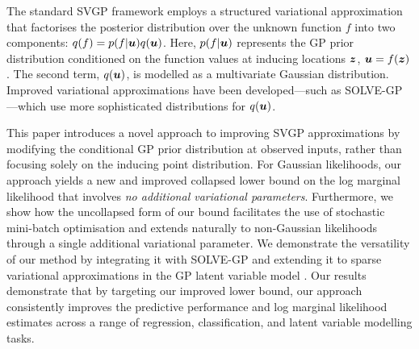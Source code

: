 The standard SVGP framework employs a structured variational approximation that factorises the posterior distribution over the unknown function $f$ into two components: $q(f) = p(f | {\bm{u}}) q({\bm{u}})$. Here, $p(f | {\bm{u}})$ represents the GP prior distribution conditioned on the function values at inducing locations ${\bm{z}}$, ${\bm{u}} = f({\bm{z}})$. The second term, $q({\bm{u}})$, is modelled as a multivariate Gaussian distribution. Improved variational approximations have been developed---such as SOLVE-GP \citep{shi2020sparse}---which use more sophisticated distributions for $q({\bm{u}})$.

This paper introduces a novel approach to improving SVGP approximations by modifying the conditional GP prior distribution at observed inputs, rather than focusing solely on the inducing point distribution. For Gaussian likelihoods, our approach yields a new and improved collapsed lower bound on the log marginal likelihood that involves \emph{no additional variational parameters}. Furthermore, we show how the uncollapsed form of our bound facilitates the use of stochastic mini-batch optimisation and extends naturally to non-Gaussian likelihoods through a single additional variational parameter. We demonstrate the versatility of our method by integrating it with SOLVE-GP and extending it to sparse variational approximations in the GP latent variable model \citep[GPLVM;][]{lawrence05, damianou16a}. Our results demonstrate that by targeting our improved lower bound, our approach consistently improves the predictive performance and log marginal likelihood estimates across a range of regression, classification, and latent variable modelling tasks.


